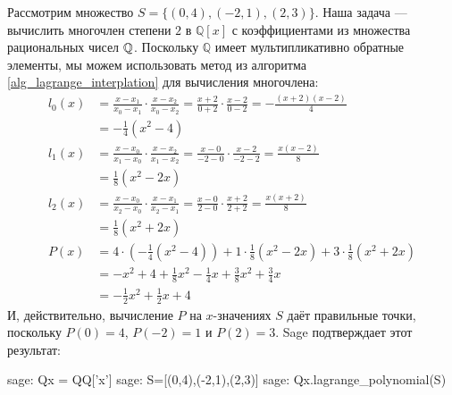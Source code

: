 \begin{example} Рассмотрим множество $S=\{(0,4),(-2,1),(2,3)\}$. Наша задача — вычислить многочлен степени $2$ в $\mathbb{Q}[x]$ с коэффициентами из множества рациональных чисел $\mathbb{Q}$. Поскольку $\mathbb{Q}$ имеет мультипликативно обратные элементы, мы можем использовать метод  из алгоритма \ref{alg_lagrange_interplation} для вычисления многочлена:
\begin{align*}
l_0(x) & = \frac{x-x_1}{x_0-x_1}\cdot\frac{x-x_2}{x_0-x_2}
         = \frac{x+2}{0+2}\cdot\frac{x-2}{0-2}
         =  -\frac{(x+2)(x-2)}{4}\\
       & = -\frac{1}{4}(x^2-4)\\
l_1(x) & = \frac{x-x_0}{x_1-x_0}\cdot\frac{x-x_2}{x_1-x_2}
          = \frac{x-0}{-2-0}\cdot \frac{x-2}{-2-2}
          = \frac{x(x-2)}{8}\\
       & = \frac{1}{8}(x^2-2x)\\
l_2(x) & = \frac{x-x_0}{x_2-x_0}\cdot\frac{x-x_1}{x_2-x_1}
          = \frac{x-0}{2-0}\cdot\frac{x+2}{2+2}
          = \frac{x(x+2)}{8}\\
       & = \frac{1}{8}(x^2+2x)\\
P(x)   & =  4\cdot (-\frac{1}{4}(x^2-4)) + 1\cdot \frac{1}{8}(x^2-2x) + 3\cdot \frac{1}{8}(x^2+2x)\\
       & = -x^2+4 + \frac{1}{8}x^2-\frac{1}{4} x + \frac{3}{8}x^2+\frac{3}{4} x \\
       & = -\frac{1}{2} x^2 +\frac{1}{2} x + 4
\end{align*}
И, действительно, вычисление $P$ на $x$-значениях $S$ даёт правильные точки, поскольку $P(0)=4$, $P(-2)=1$ и $P(2)=3$. Sage подтверждает этот результат:
\begin{sagecommandline}
sage: Qx = QQ['x']
sage: S=[(0,4),(-2,1),(2,3)]
sage: Qx.lagrange_polynomial(S)
\end{sagecommandline}
\end{example}
